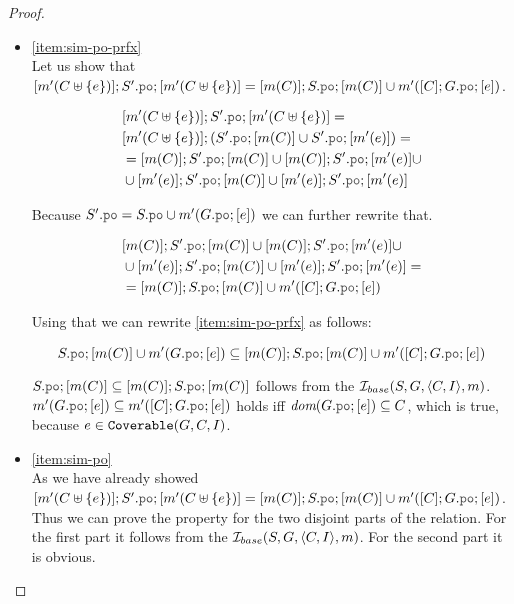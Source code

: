 \documentclass[12pt]{article}
\begin{document}
\begin{proof}
\begin{itemize}
  \item \ref{item:sim-po-prfx} \\
    Let us show that \\
    $[\lM'(\lC \uplus \{e\})];\lES'.\lPO;[\lM'(\lC \uplus \{e\})] =
    [\lM(\lC)];\lES.\lPO;[\lM(\lC)] \cup \lM'([\lC];\lG.\lPO;[e])$.
    
    \begin{equation}
      \begin{split}
        &   [\lM'(\lC \uplus \{e\})];\lES'.\lPO;[\lM'(\lC \uplus \{e\})] = \\
        &   [\lM'(\lC \uplus \{e\})];(\lES'.\lPO;[\lM(\lC)] \cup \lES'.\lPO;[\lM'(e)]) = \\
        & = [\lM(\lC)];\lES'.\lPO;[\lM(\lC)] \cup [\lM(\lC)];\lES'.\lPO;[\lM'(e)] \cup \\
        &     \cup [\lM'(e)];\lES'.\lPO;[\lM(\lC)] \cup [\lM'(e)];\lES'.\lPO;[\lM'(e)]
      \end{split}
    \end{equation}
    
    Because $\lES'.\lPO = \lES.\lPO \cup \lM'(\lG.\lPO;[e])$ we can further rewrite that.
    
    \begin{equation}
      \begin{split}
        &   [\lM(\lC)];\lES'.\lPO;[\lM(\lC)] \cup [\lM(\lC)];\lES'.\lPO;[\lM'(e)] \cup \\
        &     \cup [\lM'(e)];\lES'.\lPO;[\lM(\lC)] \cup [\lM'(e)];\lES'.\lPO;[\lM'(e)] = \\
        & = [\lM(\lC)];\lES.\lPO;[\lM(\lC)] \cup \lM'([\lC];\lG.\lPO;[e])
      \end{split}
    \end{equation}
    
    Using that we can rewrite \ref{item:sim-po-prfx} as follows:

    $$
    \lES.\lPO;[\lM(\lC)] \cup \lM'(\lG.\lPO;[e]) \subseteq
    [\lM(\lC)];\lES.\lPO;[\lM(\lC)] \cup \lM'([\lC];\lG.\lPO;[e])
    $$
    
    $\lES.\lPO;[\lM(\lC)] \subseteq [\lM(\lC)];\lES.\lPO;[\lM(\lC)]$
    follows from the $\mathcal{I}_{base}(S, G, \langle C, I \rangle, m)$.
    $\lM'(\lG.\lPO;[e]) \subseteq \lM'([\lC];\lG.\lPO;[e])$ holds iff
    $\dom{\lG.\lPO;[e]} \subseteq \lC$, which is true,
    because $e \in {\mathtt{Coverable}}(G, C, I)$.

  \item \ref{item:sim-po} \\
    As we have already showed \\
    $[\lM'(\lC \uplus \{e\})];\lES'.\lPO;[\lM'(\lC \uplus \{e\})] =
    [\lM(\lC)];\lES.\lPO;[\lM(\lC)] \cup \lM'([\lC];\lG.\lPO;[e])$.
    Thus we can prove the property for the two disjoint parts of the relation.
    For the first part it follows from the $\mathcal{I}_{base}(S, G, \langle C, I \rangle, m)$.
    For the second part it is obvious.
    
  \end{itemize}
  
\end{proof}
\end{document}

